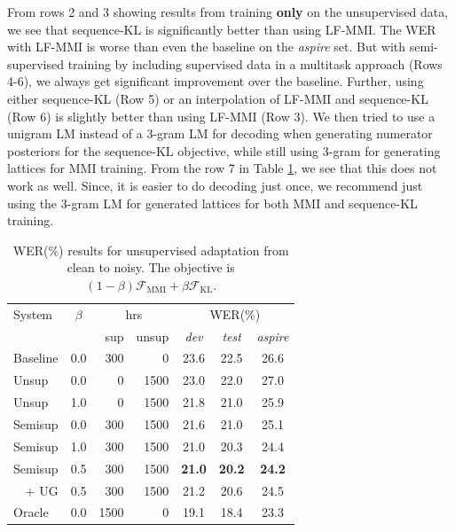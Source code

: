 \documentclass{article}
\newcommand{\Fkl}{\mathcal{F}_\text{KL}}
\newcommand{\Fmmi}{\mathcal{F}_\text{MMI}}
\begin{document}
From rows 2 and 3 showing results from training {\bf only} on the 
unsupervised data, we see that sequence-KL is significantly better than using 
LF-MMI. The WER with LF-MMI is worse than even the baseline on the {\em aspire} set.
But with semi-supervised training by including supervised data in a 
multitask approach \cite{manohar2018semisup} (Rows 4-6), 
we always get significant improvement over the baseline.
Further, using either sequence-KL (Row 5) or an interpolation of LF-MMI and 
sequence-KL (Row 6) is slightly better than using LF-MMI (Row 3). 
We then tried to use a unigram LM instead of a 3-gram LM for decoding when
generating numerator posteriors for the sequence-KL objective, 
while still using 3-gram for generating 
lattices for MMI training. From the row 7 in Table \ref{tab:aspire_results}, 
we see that this does not work as well. Since, it is easier to do decoding 
just once, we recommend just using the 3-gram LM for generated lattices for both
MMI and sequence-KL training.
\begin{table}[t]
  \centering
  \caption{\label{tab:aspire_results} 
  WER(\%) results for unsupervised adaptation from clean to noisy.
  The objective is $(1-\beta) \Fmmi + \beta \Fkl$.}
  \begin{tabular}{lc|r r|ccc}
    System & $\beta$ & \multicolumn{2}{c|}{hrs} & \multicolumn{3}{c}{WER(\%)}
    \\
    & & sup & unsup & {\em dev} & {\em test} & {\em aspire} \\
    \hline
    \hline
    Baseline & 0.0 & 300 & 0 & 23.6 & 22.5 & 26.6 \\
    \hline
    Unsup & 0.0 & 0 & 1500& 23.0 & 22.0 & 27.0 \\
    Unsup & 1.0 & 0 & 1500& 21.8 & 21.0 & 25.9 \\
    \hline
    Semisup & 0.0 & 300 & 1500 & 21.6 & 21.0 & 25.1 \\
    Semisup & 1.0 & 300 & 1500 & 21.0 & 20.3 & 24.4 \\
    Semisup & 0.5 & 300 & 1500 & \bf 21.0 & \bf 20.2 & \bf 24.2 \\
    \multicolumn{1}{r}{+ UG} & 0.5 & 300 & 1500 & 21.2 & 20.6 & 24.5 \\
    \hline
    Oracle & 0.0 & 1500 & 0 & 19.1 & 18.4 & 23.3 \\
    \hline
  \end{tabular}
\end{table}
\end{document}
